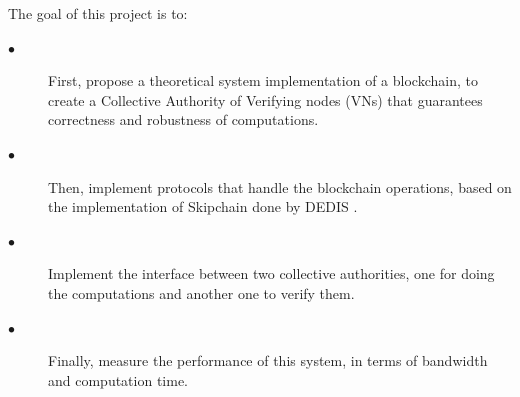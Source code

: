 \documentclass{article}
\begin{document}
The goal of this project is to:
\begin{description}
\item[$\bullet$] First, propose a theoretical system implementation of a blockchain, to create a Collective Authority of Verifying nodes (VNs) that guarantees correctness and robustness of computations.
\item[$\bullet$] Then, implement protocols that handle the blockchain operations, based on the implementation of Skipchain done by DEDIS \cite{dedis}.
\item[$\bullet$] Implement the interface between two collective authorities, one for doing the computations and another one to verify them.
\item[$\bullet$] Finally, measure the performance of this system, in terms of bandwidth and computation time.
\end{description}

\newpage

\tableofcontents

\newpage
\end{document}
